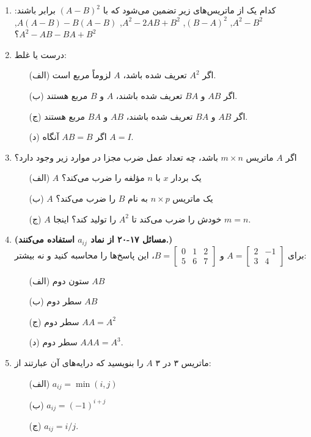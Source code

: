 \documentclass[12pt, a4paper]{book}
\begin{document}
\begin{enumerate}
		\item کدام یک از ماتریس‌های زیر تضمین می‌شود که با $(A-B)^2$ برابر باشند:
		$A^2 - B^2$, $(B-A)^2$, $A^2 - 2AB + B^2$, $A(A-B) - B(A-B)$, $A^2 - AB - BA + B^2$؟
		
		\item درست یا غلط:
		\begin{itemize}
			\item[(الف)] اگر $A^2$ تعریف شده باشد، $A$ لزوماً مربع است.
			\item[(ب)] اگر $AB$ و $BA$ تعریف شده باشند، $A$ و $B$ مربع هستند.
			\item[(ج)] اگر $AB$ و $BA$ تعریف شده باشند، $AB$ و $BA$ مربع هستند.
			\item[(د)] اگر $AB=B$ آنگاه $A=I$.
		\end{itemize}
		
		\item اگر $A$ ماتریس $m \times n$ باشد، چه تعداد عمل ضرب مجزا در موارد زیر وجود دارد؟
		\begin{itemize}
			\item[(الف)] $A$ یک بردار $x$ با $n$ مؤلفه را ضرب می‌کند؟
			\item[(ب)] $A$ یک ماتریس $n \times p$ به نام $B$ را ضرب می‌کند؟
			\item[(ج)] $A$ خودش را ضرب می‌کند تا $A^2$ را تولید کند؟ اینجا $m=n$.
		\end{itemize}
		
		\item \textbf{(مسائل ۱۷-۲۰ از نماد $a_{ij}$ استفاده می‌کنند.)}\\
		برای $A = \begin{bmatrix} 2 & -1 \\ 3 & 4 \end{bmatrix}$ و $B = \begin{bmatrix} 0 & 1 & 2 \\ 5 & 6 & 7 \end{bmatrix}$، این پاسخ‌ها را محاسبه کنید و نه بیشتر:
		\begin{itemize}
			\item[(الف)] ستون دوم $AB$
			\item[(ب)] سطر دوم $AB$
			\item[(ج)] سطر دوم $AA = A^2$
			\item[(د)] سطر دوم $AAA = A^3$.
		\end{itemize}
		
		\item ماتریس ۳ در ۳ $A$ را بنویسید که درایه‌های آن عبارتند از:
		\begin{itemize}
			\item[(الف)] $a_{ij} = \min(i, j)$
			\item[(ب)] $a_{ij} = (-1)^{i+j}$
			\item[(ج)] $a_{ij} = i/j$.
		\end{itemize}
		

\end{enumerate}
\end{document}
